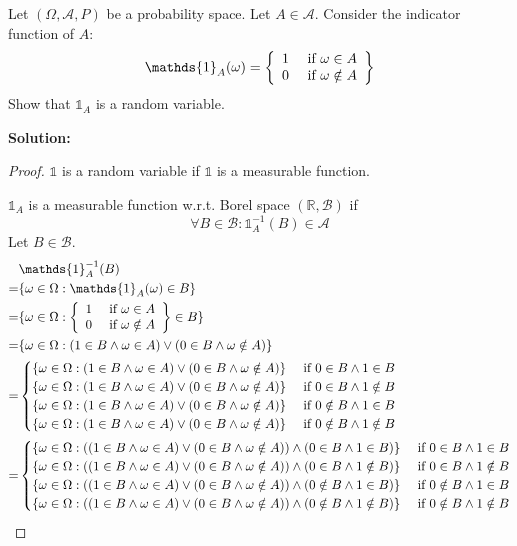 \documentclass{article}
\begin{document}
Let \((\Omega,\mathcal{A},P)\) be a probability space.
Let \(A\in \mathcal{A}\). Consider the indicator function of \(A\):
\[\mathds{1}_A(\omega)=\casesiie{1}{\omega\in A}{0}{\omega\notin A}\]
Show that \(\mathds{1}_A\) is a random variable.

\textbf{Solution:}
\begin{proof}
\(\mathds{1}\) is a random variable if \(\mathds{1}\) is a measurable function.

\(\mathds{1}_A\) is a measurable function w.r.t. Borel space \((\mathbb{R}, \mathcal{B})\) if
\[\forall B \in \mathcal{B}: \mathds{1}_A^{-1}(B)\in \mathcal{A}\]
Let \(B \in \mathcal{B}\).
\begin{align*}
     & \mathds{1}^{-1}_A(B) \\
    =& \{\omega\in\Omega:\mathds{1}_A(\omega)\in B\} \\
    =& \{\omega\in\Omega:\casesiie{1}{\omega\in A}{0}{\omega\notin A}\in B\} \\
    =& \{\omega\in\Omega:(1\in B\wedge \omega\in A)\vee (0\in B\wedge \omega \notin A)\} \\
    =& \begin{cases}
    \{\omega\in\Omega:(1\in B\wedge \omega\in A)\vee (0\in B\wedge \omega \notin A)\}&\text{ if }0\in B\wedge 1\in B\\
    \{\omega\in\Omega:(1\in B\wedge \omega\in A)\vee (0\in B\wedge \omega \notin A)\}&\text{ if }0\in B\wedge 1\notin B\\
    \{\omega\in\Omega:(1\in B\wedge \omega\in A)\vee (0\in B\wedge \omega \notin A)\}&\text{ if }0\notin B\wedge 1\in B\\
    \{\omega\in\Omega:(1\in B\wedge \omega\in A)\vee (0\in B\wedge \omega \notin A)\}&\text{ if }0\notin B\wedge 1\notin B
    \end{cases} \\
    =& \begin{cases}
    \{\omega\in\Omega:((1\in B\wedge \omega\in A)\vee (0\in B\wedge \omega \notin A))\wedge (0\in B\wedge 1\in B)\}&\text{ if }0\in B\wedge 1\in B\\
    \{\omega\in\Omega:((1\in B\wedge \omega\in A)\vee (0\in B\wedge \omega \notin A))\wedge (0\in B\wedge 1\notin B)\}&\text{ if }0\in B\wedge 1\notin B\\
    \{\omega\in\Omega:((1\in B\wedge \omega\in A)\vee (0\in B\wedge \omega \notin A))\wedge (0\notin B\wedge 1\in B)\}&\text{ if }0\notin B\wedge 1\in B\\
    \{\omega\in\Omega:((1\in B\wedge \omega\in A)\vee (0\in B\wedge \omega \notin A))\wedge (0\notin B\wedge 1\notin B)\}&\text{ if }0\notin B\wedge 1\notin B

\end{cases}
\end{align*}
\end{proof}
\end{document}
